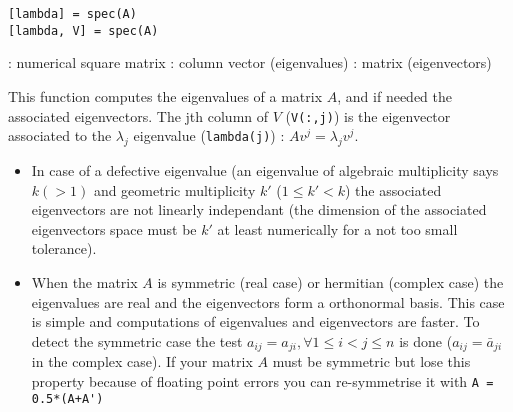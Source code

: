 
\begin{mandesc}
\end{mandesc}

\begin{calling_sequence}
\begin{verbatim}
[lambda] = spec(A)
[lambda, V] = spec(A)
\end{verbatim}
\end{calling_sequence}
\begin{parameters}
  \begin{varlist}
    :  numerical square matrix
    : column vector (eigenvalues)
    : matrix (eigenvectors)
  \end{varlist}
\end{parameters}

\begin{mandescription}
This function computes the eigenvalues of a matrix $A$, and if
needed the associated eigenvectors. The jth column of $V$ 
(\verb+V(:,j)+) is the eigenvector associated to the 
$\lambda_j$ eigenvalue (\verb+lambda(j)+) : $A v^j = \lambda_j v^j$.

\begin{itemize}
\item In case of a defective eigenvalue (an eigenvalue of
      algebraic multiplicity says $k (>1)$ and geometric multiplicity
      $k'$ ($1 \le k' < k$) the associated eigenvectors are not
      linearly independant (the dimension of the associated 
      eigenvectors space must be $k'$ at least numerically for
      a not too small tolerance).
\item When the matrix $A$ is symmetric (real case) or hermitian
      (complex case) the eigenvalues are real and the eigenvectors 
      form a orthonormal basis. This case is simple and computations
      of eigenvalues and eigenvectors are faster. To detect the
      symmetric case the test  $a_{ij} = a_{ji}, \forall 1\le i < j
      \le n$ is done ($a_{ij} = \bar{a}_{ji}$ in the complex case).
      If your matrix $A$ must be symmetric but lose this property because
      of floating point errors you can re-symmetrise it with 
      \verb-A = 0.5*(A+A')-
\end{itemize}

\end{mandescription}

